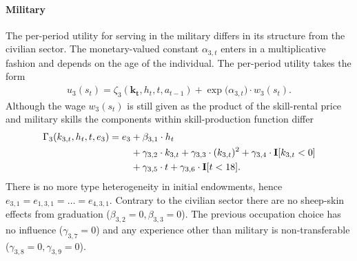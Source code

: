 \FloatBarrier\paragraph*{Military}
The per-period utility for serving in the military differs in its structure from the civilian sector. The monetary-valued constant $\alpha_{3,t}$ enters in a multiplicative fashion and depends on the age of the individual. The per-period utility takes the form
%
\begin{align}\label{eq:RewardMilitary}
    u_{3}(s_t) = \zeta_3(\bm{k_t}, h_t, t , a_{t -1})  + \exp \big( \alpha_{3, t} \big) \cdot w_{3}(s_t).
\end{align}
%
\noindent Although the wage $w_{3}(s_t)$ is still given as the product of the skill-rental price and military skills the components within skill-production function differ
%
\begin{align}
    \Gamma_3( k_{3,t}, h_t, t, e_3) = e_3 & + \beta_{3,1} \cdot h_t \nonumber \\
	               \nonumber &+ \gamma_{3,2} \cdot  k_{3,t} + \gamma_{3,3} \cdot (k_{3,t})^2 + \gamma_{3,4} \cdot {\textbf{I}}[k_{3,t} < 0] \\
									 & + \gamma_{3,5} \cdot t + \gamma_{3,6} \cdot {\textbf{I}}[t < 18].
\end{align}
%
There is no more type heterogeneity in initial endowments, hence $e_{3,1} = e_{1,3,1} = \dots = e_{4,3,1}$. Contrary to the civilian sector there are no sheep-skin effects from graduation ($\beta_{3,2} = 0, \beta_{3,3}= 0$). The previous occupation choice has no influence ($\gamma_{3,7}= 0$) and any experience other than military is non-transferable ($\gamma_{3,8} = 0, \gamma_{3,9} = 0$).\\

